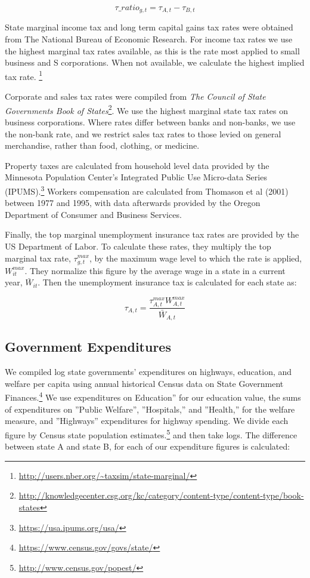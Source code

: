 \begin{equation} \tau\_ratio_{g,t} = \tau_{A,t}-\tau_{B,t} \end{equation}

State marginal income tax and long term capital gains tax rates were obtained from The National Bureau of Economic Research. For income tax rates we use the highest marginal tax rates available, as this is the rate most applied to small business and S corporations. When not available, we calculate the highest implied tax rate. \footnote{\url{http://users.nber.org/~taxsim/state-marginal/}}

Corporate and sales tax rates were compiled from \textit{The Council of State Governments Book of States}\footnote{\url{http://knowledgecenter.csg.org/kc/category/content-type/content-type/book-states}}. We use the highest marginal state tax rates on business corporations. Where rates differ between banks and non-banks, we use the non-bank rate, and we restrict sales tax rates to those levied on general merchandise, rather than food, clothing, or medicine.

Property taxes are calculated from household level data provided by the Minnesota Population Center’s Integrated Public Use Micro-data Series (IPUMS).\footnote{\url{https://usa.ipums.org/usa/}} Workers compensation are calculated from Thomason et al (2001) between 1977 and 1995, with data afterwards provided by the Oregon Department of Consumer and Business Services. 

Finally, the top marginal unemployment insurance tax rates are provided by the US Department of Labor. To calculate these rates, they multiply the top marginal tax rate, $\tau_{g,t}^{max}$, by the maximum wage level to which the rate is applied, $W_{it}^{max}$. They normalize this figure by the average wage in a state in a current year, $\bar W_{it}$. Then the unemployment insurance tax is calculated for each state as: 

\begin{equation} \tau_{A,t} = \frac{\tau_{A,t}^{max}W_{A,t}^{max}}{\bar W_{A,t}}\end{equation}

\subsection{Government Expenditures}

We compiled log state governments’ expenditures on highways, education, and welfare per capita using annual historical Census data on State Government Finances.\footnote{\url{https://www.census.gov/govs/state/}} We use expenditures on Education” for our education value, the sums of expenditures on ”Public Welfare”, ”Hospitals,” and ”Health,” for the welfare measure, and ”Highways” expenditures for highway spending.  We divide each figure by Census state population estimates.\footnote{\url{http://www.census.gov/popest/}} and then take logs. The difference between state A and state B, for each of our expenditure figures is calculated:

